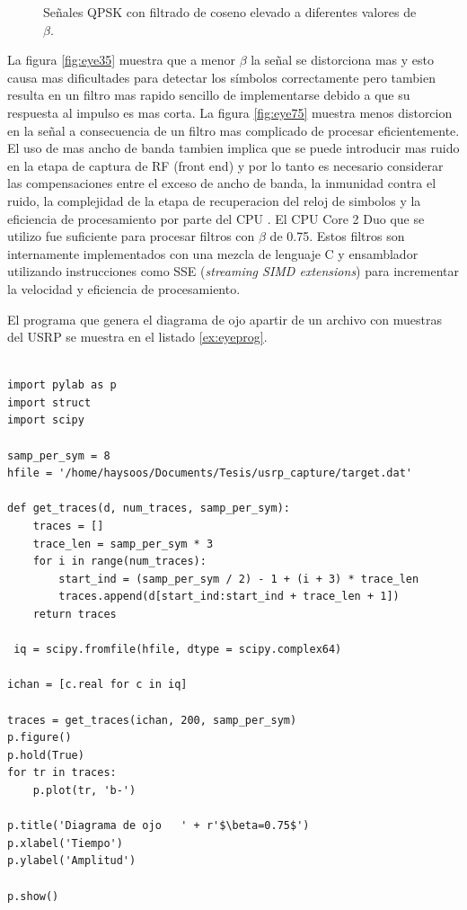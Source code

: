 \begin{figure}[htp]
  \vspace{0.3in}
  \caption{Se\~nales QPSK con filtrado de coseno elevado a diferentes valores de $\beta$.}
  \label{fig:rrcsignals}
\end{figure}

La figura \ref{fig:eye35} muestra que a menor $\beta$ la se\~nal se distorciona mas y esto causa mas
dificultades para detectar los s\'imbolos correctamente pero tambien resulta en un filtro mas rapido
sencillo de implementarse debido a que su respuesta al impulso es mas corta. La figura
\ref{fig:eye75} muestra menos distorcion en la se\~nal a consecuencia de un filtro mas complicado de
procesar eficientemente. El uso de mas ancho de banda tambien implica que se puede introducir mas
ruido en la etapa de captura de RF (front end) y por lo tanto es necesario considerar las
compensaciones entre el exceso de ancho de banda, la inmunidad contra el ruido, la complejidad de
la etapa de recuperacion del reloj de simbolos y la eficiencia de procesamiento por parte del CPU
\cite{lee}. El CPU Core 2 Duo que se utilizo fue suficiente para procesar filtros con $\beta$ de
0.75. Estos filtros son internamente implementados con una mezcla de lenguaje C y ensamblador utilizando
instrucciones como SSE (\emph{streaming SIMD extensions}) para incrementar la velocidad y eficiencia
de procesamiento.

El programa que genera el diagrama de ojo apartir de un archivo con muestras del USRP se muestra en
el listado \ref{ex:eyeprog}.
\begin{lstlisting}[float, label=ex:eyeprog, caption={Programa que genera el diagrama de ojo a partir
de muestras tomadas del USRP.}, breaklines=true]

import pylab as p
import struct
import scipy

samp_per_sym = 8
hfile = '/home/haysoos/Documents/Tesis/usrp_capture/target.dat'

def get_traces(d, num_traces, samp_per_sym):
    traces = []
    trace_len = samp_per_sym * 3
    for i in range(num_traces):
        start_ind = (samp_per_sym / 2) - 1 + (i + 3) * trace_len
        traces.append(d[start_ind:start_ind + trace_len + 1])
    return traces
    
 iq = scipy.fromfile(hfile, dtype = scipy.complex64)

ichan = [c.real for c in iq]

traces = get_traces(ichan, 200, samp_per_sym)
p.figure()
p.hold(True)
for tr in traces:
    p.plot(tr, 'b-')

p.title('Diagrama de ojo   ' + r'$\beta=0.75$')
p.xlabel('Tiempo')
p.ylabel('Amplitud')

p.show()
\end{lstlisting}
